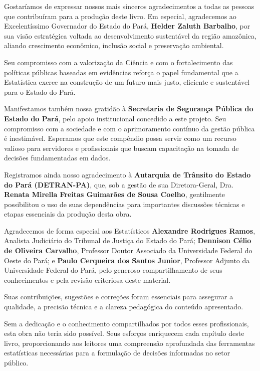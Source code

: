 \begin{refsection}

Gostaríamos de expressar nossos mais sinceros agradecimentos a todas as pessoas
que contribuíram para a produção deste livro. Em especial, agradecemos ao
Excelentíssimo Governador do Estado do Pará, \textbf{Helder Zaluth Barbalho},
por sua visão estratégica voltada ao desenvolvimento sustentável da região amazônica,
aliando crescimento econômico, inclusão social e preservação ambiental. \vskip0.3cm

Seu compromisso com a valorização da Ciência e com o fortalecimento das políticas
públicas baseadas em evidências reforça o papel fundamental que a Estatística exerce
na construção de um futuro mais justo, eficiente e sustentável para o Estado do Pará.
\vskip0.3cm

Manifestamos também nossa gratidão à \textbf{Secretaria de Segurança Pública do Estado do Pará},
pelo apoio institucional concedido a este projeto. Seu compromisso com a sociedade e
com o aprimoramento contínuo da gestão pública é inestimável. Esperamos que este
compêndio possa servir como um recurso valioso para servidores e profissionais que
buscam capacitação na tomada de decisões fundamentadas em dados.
\vskip0.3cm

Registramos ainda nosso agradecimento à \textbf{Autarquia de Trânsito do Estado do Pará (DETRAN-PA)},
que, sob a gestão de sua Diretora-Geral, Dra. \textbf{Renata Mirella Freitas Guimarães de Sousa Coelho},
gentilmente possibilitou o uso de suas dependências para importantes discussões técnicas
e etapas essenciais da produção desta obra.
\vskip0.3cm

Agradecemos de forma especial aos Estatísticos
\textbf{Alexandre Rodrigues Ramos}, Analista Judiciário do Tribunal de Justiça do Estado do Pará;
\textbf{Dennison Célio de Oliveira Carvalho}, Professor Doutor Associado da Universidade Federal
do Oeste do Pará; e
\textbf{Paulo Cerqueira dos Santos Junior}, Professor Adjunto da Universidade Federal do Pará,
pelo generoso compartilhamento de seus conhecimentos e pela revisão criteriosa deste material.

\newpage
Suas contribuições, sugestões e correções foram essenciais para assegurar a qualidade,
a precisão técnica e a clareza pedagógica do conteúdo apresentado.
\vskip0.3cm

Sem a dedicação e o conhecimento compartilhados por todos esses profissionais,
esta obra não teria sido possível. Seus esforços enriquecem cada capítulo deste livro,
proporcionando aos leitores uma compreensão aprofundada das ferramentas estatísticas
necessárias para a formulação de decisões informadas no setor público.
\vskip0.3cm


\end{refsection}
